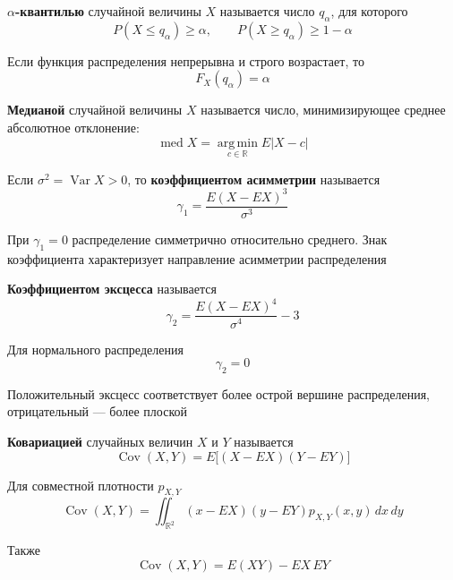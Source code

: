 \documentclass[12pt,a4paper]{article}
\begin{document}
\begin{definition}

\textbf{$\alpha$-квантилью} случайной величины $X$ называется число $q_\alpha$, для которого
\[
P(X\leq q_\alpha)\geq\alpha,
\qquad
P(X\geq q_\alpha)\geq1-\alpha
\]

Если функция распределения непрерывна и строго возрастает, то
\[
F_X(q_\alpha)=\alpha
\]

\end{definition}

\begin{definition}

\textbf{Медианой} случайной величины $X$ называется число, минимизирующее среднее абсолютное отклонение:
\[
\operatorname{med}X
=
\operatorname*{arg\,min}_{c\in\mathbb{R}}E|X-c|
\]

\end{definition}

\begin{definition}

Если $\sigma^2=\operatorname{Var}X>0$, то \textbf{коэффициентом асимметрии} называется
\[
\gamma_1
=
\frac{E(X-EX)^3}{\sigma^3}
\]

При $\gamma_1=0$ распределение симметрично относительно среднего. Знак коэффициента характеризует направление асимметрии распределения

\end{definition}

\begin{definition}

\textbf{Коэффициентом эксцесса} называется
\[
\gamma_2
=
\frac{E(X-EX)^4}{\sigma^4}-3
\]

Для нормального распределения
\[
\gamma_2=0
\]

Положительный эксцесс соответствует более острой вершине распределения, отрицательный --- более плоской

\end{definition}

\begin{definition}

\textbf{Ковариацией} случайных величин $X$ и $Y$ называется
\[
\operatorname{Cov}(X,Y)
=
E\bigl[(X-EX)(Y-EY)\bigr]
\]

Для совместной плотности $p_{X,Y}$
\[
\operatorname{Cov}(X,Y)
=
\iint_{\mathbb{R}^2}
(x-EX)(y-EY)p_{X,Y}(x,y)\,dx\,dy
\]

Также
\[
\operatorname{Cov}(X,Y)
=
E(XY)-EX\,EY
\]

\end{definition}
\end{document}

